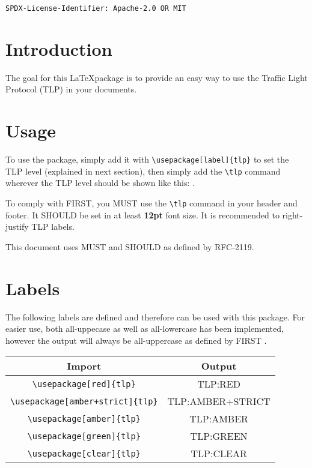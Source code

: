 \documentclass[a4paper,12pt]{article}
\begin{document}
\verb|SPDX-License-Identifier: Apache-2.0 OR MIT|

\section{Introduction}
The goal for this \LaTeX package is to provide an easy way to use the Traffic
Light Protocol (TLP)\cite{TrafficL20:online} in your documents.

\section{Usage}
To use the package, simply add it with \verb|\usepackage[label]{tlp}| to set
the TLP level (explained in next section), then simply add the \verb|\tlp|
command wherever the TLP level should be shown like this: \tlp.

To comply with FIRST, you MUST use the \verb|\tlp| command in your header and
footer. It SHOULD be set in at least \textbf{12pt} font size. It is recommended to
right-justify TLP labels.

This document uses MUST and SHOULD as defined by RFC-2119\cite{rfc2119}.

\section{Labels}
The following labels are defined and therefore can be used with this package.
For easier use, both all-uppecase as well as all-lowercase has been implemented,
however the output will always be all-uppercase as defined by FIRST
\cite{TrafficL20:online}.

\begin{center}
    \begin{tabular}{|c|c|} 
        \hline
        \textbf{Import} & \textbf{Output} \\
        \hline
        \hline
        \verb|\usepackage[red]{tlp}| & \colorbox{tlp-c-black}{\textcolor{tlp-c-red}{TLP:RED}} \\
        \hline
        \verb|\usepackage[amber+strict]{tlp}| & \colorbox{tlp-c-black}{\textcolor{tlp-c-amber}{TLP:AMBER+STRICT}} \\
        \hline
        \verb|\usepackage[amber]{tlp}| & \colorbox{tlp-c-black}{\textcolor{tlp-c-amber}{TLP:AMBER}} \\
        \hline
        \verb|\usepackage[green]{tlp}| & \colorbox{tlp-c-black}{\textcolor{tlp-c-green}{TLP:GREEN}} \\
        \hline
        \verb|\usepackage[clear]{tlp}| & \colorbox{tlp-c-black}{\textcolor{tlp-c-clear}{TLP:CLEAR}} \\
        \hline
    \end{tabular}
\end{center}



\end{document}
